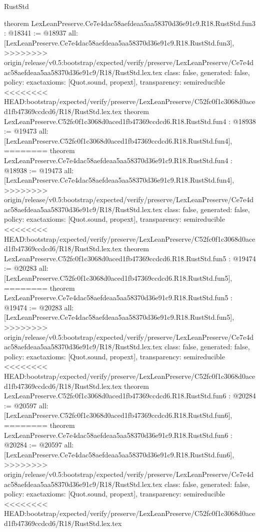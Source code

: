 \begin{lexlean}{RustStd}
\begin{coremodule}
{\begin{coremodule}
{{{{{{theorem LexLeanPreserve.Ce7e4dac58aefdeaa5aa58370d36e91c9.R18.RustStd.fun3 : @18341 := @18937 {
  all: [LexLeanPreserve.Ce7e4dac58aefdeaa5aa58370d36e91c9.R18.RustStd.fun3],
>>>>>>>> origin/release/v0.5:bootstrap/expected/verify/preserve/LexLeanPreserve/Ce7e4dac58aefdeaa5aa58370d36e91c9/R18/RustStd.lex.tex
  class: false,
  generated: false,
  policy: exact{axioms: [Quot.sound, propext]},
  transparency: semireducible
}
<<<<<<<< HEAD:bootstrap/expected/verify/preserve/LexLeanPreserve/C52fc0f1c3068d0aced1fb47369ccdcd6/R18/RustStd.lex.tex
theorem LexLeanPreserve.C52fc0f1c3068d0aced1fb47369ccdcd6.R18.RustStd.fun4 : @18938 := @19473 {
  all: [LexLeanPreserve.C52fc0f1c3068d0aced1fb47369ccdcd6.R18.RustStd.fun4],
========
theorem LexLeanPreserve.Ce7e4dac58aefdeaa5aa58370d36e91c9.R18.RustStd.fun4 : @18938 := @19473 {
  all: [LexLeanPreserve.Ce7e4dac58aefdeaa5aa58370d36e91c9.R18.RustStd.fun4],
>>>>>>>> origin/release/v0.5:bootstrap/expected/verify/preserve/LexLeanPreserve/Ce7e4dac58aefdeaa5aa58370d36e91c9/R18/RustStd.lex.tex
  class: false,
  generated: false,
  policy: exact{axioms: [Quot.sound, propext]},
  transparency: semireducible
}
<<<<<<<< HEAD:bootstrap/expected/verify/preserve/LexLeanPreserve/C52fc0f1c3068d0aced1fb47369ccdcd6/R18/RustStd.lex.tex
theorem LexLeanPreserve.C52fc0f1c3068d0aced1fb47369ccdcd6.R18.RustStd.fun5 : @19474 := @20283 {
  all: [LexLeanPreserve.C52fc0f1c3068d0aced1fb47369ccdcd6.R18.RustStd.fun5],
========
theorem LexLeanPreserve.Ce7e4dac58aefdeaa5aa58370d36e91c9.R18.RustStd.fun5 : @19474 := @20283 {
  all: [LexLeanPreserve.Ce7e4dac58aefdeaa5aa58370d36e91c9.R18.RustStd.fun5],
>>>>>>>> origin/release/v0.5:bootstrap/expected/verify/preserve/LexLeanPreserve/Ce7e4dac58aefdeaa5aa58370d36e91c9/R18/RustStd.lex.tex
  class: false,
  generated: false,
  policy: exact{axioms: [Quot.sound, propext]},
  transparency: semireducible
}
<<<<<<<< HEAD:bootstrap/expected/verify/preserve/LexLeanPreserve/C52fc0f1c3068d0aced1fb47369ccdcd6/R18/RustStd.lex.tex
theorem LexLeanPreserve.C52fc0f1c3068d0aced1fb47369ccdcd6.R18.RustStd.fun6 : @20284 := @20597 {
  all: [LexLeanPreserve.C52fc0f1c3068d0aced1fb47369ccdcd6.R18.RustStd.fun6],
========
theorem LexLeanPreserve.Ce7e4dac58aefdeaa5aa58370d36e91c9.R18.RustStd.fun6 : @20284 := @20597 {
  all: [LexLeanPreserve.Ce7e4dac58aefdeaa5aa58370d36e91c9.R18.RustStd.fun6],
>>>>>>>> origin/release/v0.5:bootstrap/expected/verify/preserve/LexLeanPreserve/Ce7e4dac58aefdeaa5aa58370d36e91c9/R18/RustStd.lex.tex
  class: false,
  generated: false,
  policy: exact{axioms: [Quot.sound, propext]},
  transparency: semireducible
}
<<<<<<<< HEAD:bootstrap/expected/verify/preserve/LexLeanPreserve/C52fc0f1c3068d0aced1fb47369ccdcd6/R18/RustStd.lex.tex
}}}}}}}}}
\end{coremodule}}
\end{coremodule}
\end{lexlean}
